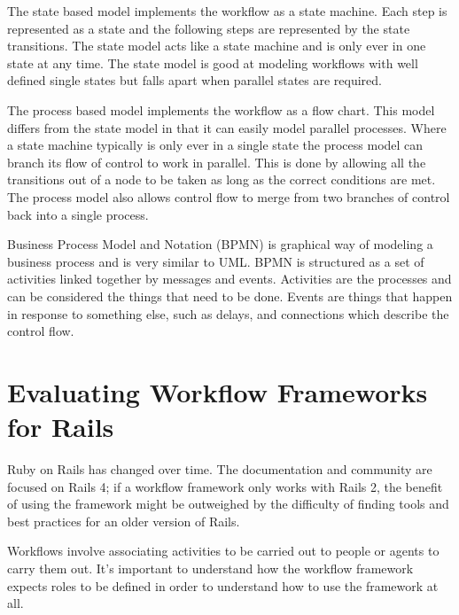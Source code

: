 The state based model implements the workflow as a state machine. Each step is represented as a state and the following steps are represented by the state transitions. The state model acts like a state machine and is only ever in one state at any time. The state model is good at modeling workflows with well defined single states but falls apart when parallel states are required.

The process based model implements the workflow as a flow chart. This model differs from the state model in that it can easily model parallel processes. Where a state machine typically is only ever in a single state the process model can branch its flow of control to work in parallel. This is done by allowing all the transitions out of a node to be taken as long as the correct conditions are met. The process model also allows control flow to merge from two branches of control back into a single process.

Business Process Model and Notation (BPMN) is graphical way of modeling a business process and is very similar to UML. BPMN is structured as a set of activities linked together by messages and events. Activities are the processes and can be considered the things that need to be done. Events are things that happen in response to something else, such as delays, and connections which describe the control flow.


\section {Evaluating Workflow Frameworks for Rails}



Ruby on Rails has changed over time. The documentation and community are focused on Rails 4; if a workflow framework only works with Rails 2, the benefit of using the framework might be outweighed by the difficulty of finding tools and best practices for an older version of Rails.


Workflows involve associating activities to be carried out to people or agents to carry them out. It’s important to understand how the workflow framework expects roles to be defined in order to understand how to use the framework at all.


